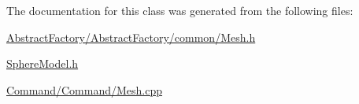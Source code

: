 The documentation for this class was generated from the following files\+:\begin{DoxyCompactItemize}
\item 
\mbox{\hyperlink{_abstract_factory_2_abstract_factory_2common_2_mesh_8h}{Abstract\+Factory/\+Abstract\+Factory/common/\+Mesh.\+h}}\item 
\mbox{\hyperlink{_sphere_model_8h}{Sphere\+Model.\+h}}\item 
\mbox{\hyperlink{_command_2_command_2_mesh_8cpp}{Command/\+Command/\+Mesh.\+cpp}}\end{DoxyCompactItemize}
